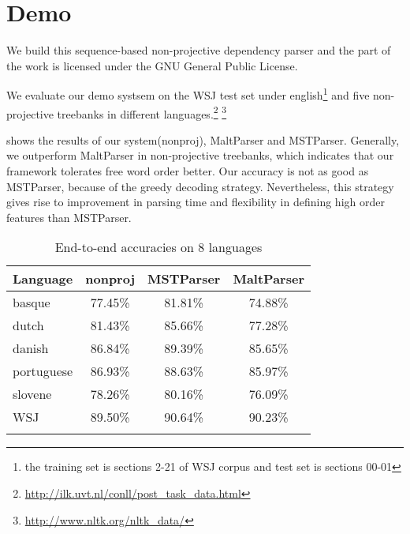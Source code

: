 \section{Demo}
We build this sequence-based non-projective dependency parser and the part of
the work is licensed under the GNU General Public License.

We evaluate our demo systsem on the WSJ test set under english\footnote{the training set is sections 2-21 of WSJ corpus and test set is sections 00-01} and five non-projective treebanks in different
languages.\footnote{\url{http://ilk.uvt.nl/conll/post_task_data.html}}
\footnote{\url{http://www.nltk.org/nltk_data/}}


 shows the results of our system(nonproj), MaltParser and MSTParser. Generally, we outperform MaltParser in non-projective treebanks,
which indicates that our framework tolerates free word order better.
Our accuracy is not as good as MSTParser, because of the greedy decoding strategy.
Nevertheless, this strategy gives rise to improvement in
parsing time and flexibility in defining high order features than MSTParser.
\begin{table}[th]
\small
    \centering
    \caption{End-to-end accuracies on 8 languages}
    \begin{tabular}{l|ccc}
        \whline
        Language & nonproj & MSTParser & MaltParser \\
        \hline
        basque & 77.45\% & 81.81\% & 74.88\% \\
        dutch & 81.43\% & 85.66\% & 77.28\% \\
        danish & 86.84\% & 89.39\% & 85.65\% \\
        portuguese & 86.93\% & 88.63\% & 85.97\% \\
        slovene & 78.26\% & 80.16\% & 76.09\% \\
        WSJ & 89.50\% & 90.64\% & 90.23\% \\
        \whline
    \end{tabular}%
    \label{tab:multilingual test}%
\end{table}

